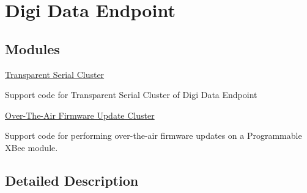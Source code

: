 \hypertarget{group__xbee__digi__data}{}\section{Digi Data Endpoint}
\label{group__xbee__digi__data}
\subsection*{Modules}
\begin{DoxyCompactItemize}
\item 
\hyperlink{group__xbee__transparent}{Transparent Serial Cluster}
\begin{DoxyCompactList}\small\item\em \begin{DoxyVerb}  Support code for Transparent Serial Cluster of Digi Data Endpoint\end{DoxyVerb}
 \end{DoxyCompactList}\item 
\hyperlink{group__xbee__ota}{Over-\/\+The-\/\+Air Firmware Update Cluster}
\begin{DoxyCompactList}\small\item\em \begin{DoxyVerb}  Support code for performing over-the-air firmware updates on a
  Programmable XBee module.\end{DoxyVerb}
 \end{DoxyCompactList}\end{DoxyCompactItemize}


\subsection{Detailed Description}
